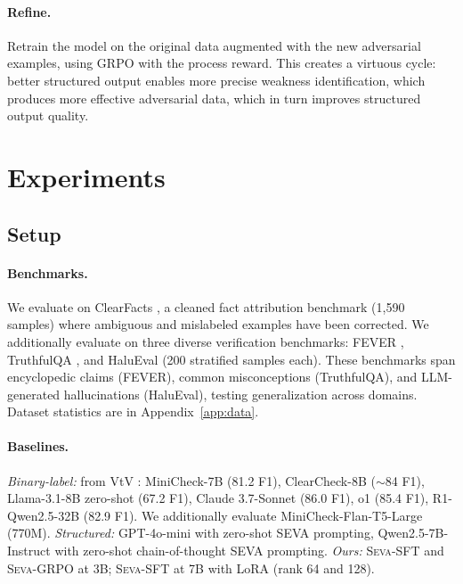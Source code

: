 \documentclass[11pt]{article}
\newcommand{\seva}{\textsc{Seva}\xspace}
\begin{document}
\paragraph{Refine.}
Retrain the model on the original data augmented with the new adversarial examples, using GRPO with the process reward.
This creates a virtuous cycle: better structured output enables more precise weakness identification, which produces more effective adversarial data, which in turn improves structured output quality.


\FloatBarrier
\section{Experiments}
\label{sec:experiments}

\subsection{Setup}

\paragraph{Benchmarks.}
We evaluate on ClearFacts \citep{seo2025vtv}, a cleaned fact attribution benchmark (1,590 samples) where ambiguous and mislabeled examples have been corrected.
We additionally evaluate on three diverse verification benchmarks: FEVER \citep{thorne2018fever}, TruthfulQA \citep{lin2022truthfulqa}, and HaluEval \citep{li2023halueval} (200 stratified samples each).
These benchmarks span encyclopedic claims (FEVER), common misconceptions (TruthfulQA), and LLM-generated hallucinations (HaluEval), testing generalization across domains.
Dataset statistics are in Appendix~\ref{app:data}.

\paragraph{Baselines.}
\textit{Binary-label:} from VtV \citep{seo2025vtv}: MiniCheck-7B \citep{tang2024minicheck} (81.2 F1), ClearCheck-8B ($\sim$84 F1), Llama-3.1-8B zero-shot (67.2 F1), Claude 3.7-Sonnet (86.0 F1), o1 (85.4 F1), R1-Qwen2.5-32B (82.9 F1). We additionally evaluate MiniCheck-Flan-T5-Large (770M).
\textit{Structured:} GPT-4o-mini with zero-shot SEVA prompting, Qwen2.5-7B-Instruct with zero-shot chain-of-thought SEVA prompting.
\textit{Ours:} \seva-SFT and \seva-GRPO at 3B; \seva-SFT at 7B with LoRA (rank 64 and 128).
\end{document}
